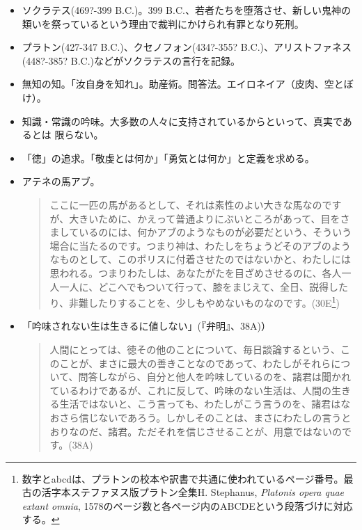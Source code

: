\documentclass{jsarticle}
\begin{document}
\begin{itemize}


\item ソクラテス(469?-399 B.C.)。399 B.C.、若者たちを堕落させ、新しい鬼神の類いを祭っているという理由で裁判にかけられ有罪となり死刑。

\item プラトン(427-347 B.C.)、クセノフォン(434?-355? B.C.)、アリストファネス(448?-385? B.C.)などがソクラテスの言行を記録。

\item 無知の知。「汝自身を知れ」。助産術。問答法。エイロネイア（皮肉、空とぼけ）。

\item 知識・常識の吟味。大多数の人々に支持されているからといって、真実であるとは
限らない。

\item 「徳」の追求。「敬虔とは何か」「勇気とは何か」と定義を求める。


\item アテネの馬アブ。
  \begin{quote}
     ここに一匹の馬があるとして、それは素性のよい大きな馬なのですが、大きいために、かえって普通よりにぶいところがあって、目をさましているのには、何かアブのようなものが必要だという、そういう場合に当たるのです。つまり神は、わたしをちょうどそのアブのようなものとして、このポリスに付着させたのではないかと、わたしには思われる。つまりわたしは、あなたがたを目ざめさせるのに、各人一人一人に、どこへでもついて行って、膝をまじえて、全日、説得したり、非難したりすることを、少しもやめないものなのです。(30E\footnote{数字とabcdは、プラトンの校本や訳書で共通に使われているページ番号。最古の活字本ステファヌス版プラトン全集H. Stephanus, \emph{Platonis opera quae extant omnia}, 1578のページ数と各ページ内のABCDEという段落づけに対応する。})
  \end{quote}


\item 「吟味されない生は生きるに値しない」(『弁明』、38A)）

  \begin{quote}
    人間にとっては、徳その他のことについて、毎日談論するという、このことが、まさに最大の善きことなのであって、わたしがそれらについて、問答しながら、自分と他人を吟味しているのを、諸君は聞かれているわけであるが、これに反して、吟味のない生活は、人間の生きる生活ではないと、こう言っても、わたしがこう言うのを、諸君はなおさら信じないであろう。しかしそのことは、まさにわたしの言うとおりなのだ、諸君。ただそれを信じさせることが、用意ではないのです。(38A)
  \end{quote}



\end{itemize}
\end{document}

